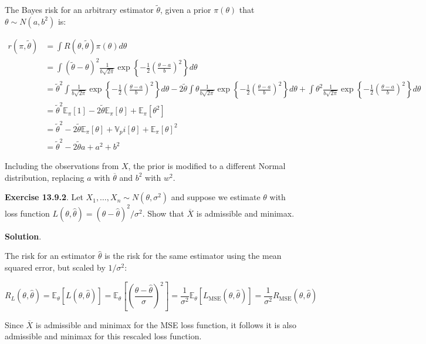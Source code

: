 The Bayes risk for an arbitrary estimator \(\tilde{\theta}\), given a
prior \(\pi(\theta)\) that \(\theta \sim N(a, b^{2})\) is:

\begin{align*}
r(\pi, \tilde{\theta}) &= \int R(\theta, \tilde{\theta}) \pi(\theta) d\theta \\
&= \int (\tilde{\theta} - \theta)^{2} \frac{1}{b \sqrt{2 \pi}} \exp \left\{ -\frac{1}{2} \left(\frac{\theta - a}{b}\right)^{2} \right\} d\theta \\
&= \tilde{\theta}^{2} \int \frac{1}{b \sqrt{2 \pi}} \exp \left\{ -\frac{1}{2} \left(\frac{\theta - a}{b}\right)^{2} \right\} d\theta
- 2 \tilde{\theta} \int \theta \frac{1}{b \sqrt{2 \pi}} \exp \left\{ -\frac{1}{2} \left(\frac{\theta - a}{b}\right)^{2} \right\} d\theta
+ \int \theta^{2} \frac{1}{b \sqrt{2 \pi}} \exp \left\{ -\frac{1}{2} \left(\frac{\theta - a}{b}\right)^{2} \right\} d\theta \\
&= \tilde{\theta}^{2} \mathbb{E}_\pi[1] - 2 \tilde{\theta} \mathbb{E}_\pi[\theta] + \mathbb{E}_\pi[\theta^{2}] \\
&= \tilde{\theta}^{2} - 2 \tilde{\theta} \mathbb{E}_\pi[\theta] + \mathbb{V}_pi[\theta] + \mathbb{E}_\pi[\theta]^{2} \\
&= \tilde{\theta}^{2} - 2 \tilde{\theta} a + a^{2} + b^{2}
\end{align*}

Including the observations from \(X\), the prior is modified to a
different Normal distribution, replacing \(a\) with
\(\overline{\theta}\) and \(b^{2}\) with \(w^{2}\).

\textbf{Exercise 13.9.2}. Let
\(X_{1}, \dots, X_{n} \sim N(\theta, \sigma^{2})\) and suppose we estimate
\(\theta\) with loss function
\(L(\theta, \hat{\theta}) = (\theta - \hat{\theta})^{2} / \sigma^{2}\). Show
that \(\overline{X}\) is admissible and minimax.

\textbf{Solution}.

The risk for an estimator \(\hat{\theta}\) is the risk for the same
estimator using the mean squared error, but scaled by \(1 / \sigma^{2}\):

\[
R_L(\theta, \hat{\theta}) = \mathbb{E}_\theta[L(\theta, \hat{\theta})] 
= \mathbb{E}_\theta\left[\left( \frac{\theta - \hat{\theta}}{\sigma} \right)^{2} \right] 
= \frac{1}{\sigma^{2}} \mathbb{E}_\theta[ L_\text{MSE}(\theta, \hat{\theta})]  
= \frac{1}{\sigma^{2}} R_\text{MSE}(\theta, \hat{\theta})
\]

Since \(\overline{X}\) is admissible and minimax for the MSE loss
function, it follows it is also admissible and minimax for this rescaled
loss function.


